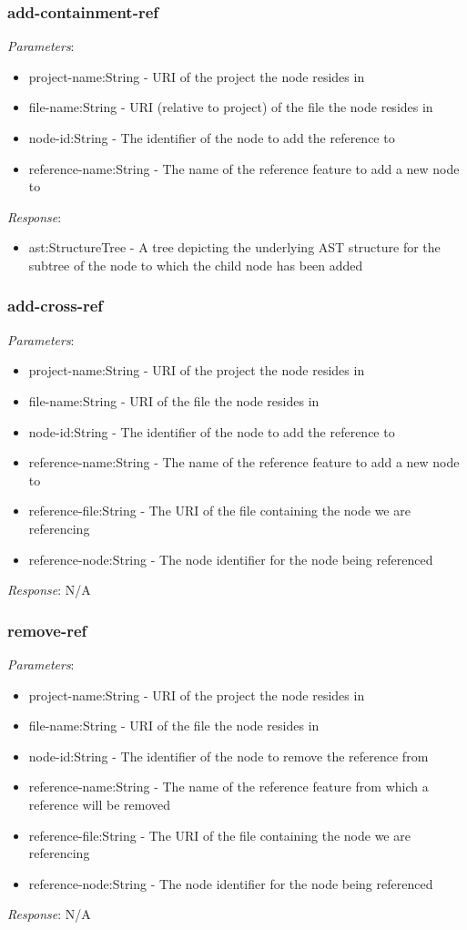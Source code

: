 \subsubsection{add-containment-ref}
\emph{Parameters}: 
\begin{itemize}
\item project-name:String - URI of the project the node resides in
\item file-name:String - URI (relative to project) of the file the node resides in
\item node-id:String - The identifier of the node to add the reference to
\item reference-name:String - The name of the reference feature to add a new node to
\end{itemize}
\emph{Response}: 
\begin{itemize}
\item ast:StructureTree - A tree depicting the underlying AST structure for the subtree of the node to which the child node has been added
\end{itemize}

\subsubsection{add-cross-ref}
\emph{Parameters}: 
\begin{itemize}
\item project-name:String - URI of the project the node resides in
\item file-name:String - URI of the file the node resides in
\item node-id:String - The identifier of the node to add the reference to
\item reference-name:String - The name of the reference feature to add a new node to
\item reference-file:String - The URI of the file containing the node we are referencing
\item reference-node:String - The node identifier for the node being referenced
\end{itemize}
\emph{Response}: N/A

\subsubsection{remove-ref}
\emph{Parameters}: 
\begin{itemize}
\item project-name:String - URI of the project the node resides in
\item file-name:String - URI of the file the node resides in
\item node-id:String - The identifier of the node to remove the reference from
\item reference-name:String - The name of the reference feature from which a reference will be removed
\item reference-file:String - The URI of the file containing the node we are referencing
\item reference-node:String - The node identifier for the node being referenced
\end{itemize}
\emph{Response}: N/A

